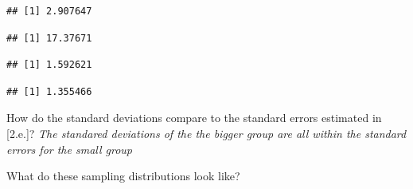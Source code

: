 \documentclass[]{article}
\newenvironment{Shaded}{\begin{snugshade}}{\end{snugshade}}
\newcommand{\KeywordTok}[1]{\textcolor[rgb]{0.13,0.29,0.53}{\textbf{#1}}}
\newcommand{\DataTypeTok}[1]{\textcolor[rgb]{0.13,0.29,0.53}{#1}}
\newcommand{\StringTok}[1]{\textcolor[rgb]{0.31,0.60,0.02}{#1}}
\newcommand{\OperatorTok}[1]{\textcolor[rgb]{0.81,0.36,0.00}{\textbf{#1}}}
\newcommand{\NormalTok}[1]{#1}
\begin{document}
\begin{verbatim}
## [1] 2.907647
\end{verbatim}

\begin{Shaded}
\end{Shaded}

\begin{verbatim}
## [1] 17.37671
\end{verbatim}

\begin{Shaded}
\end{Shaded}

\begin{verbatim}
## [1] 1.592621
\end{verbatim}

\begin{Shaded}
\end{Shaded}

\begin{verbatim}
## [1] 1.355466
\end{verbatim}

How do the standard deviations compare to the standard errors estimated
in {[}2.e.{]}? \emph{The standared deviations of the the bigger group
are all within the standard errors for the small group}

What do these sampling distributions look like?

\begin{Shaded}
\end{Shaded}
\end{document}
